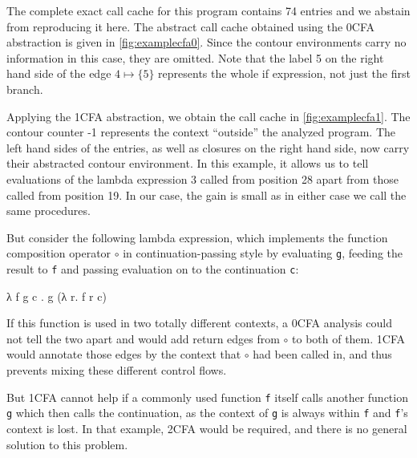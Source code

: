 \documentclass[a4paper,parskip=half,BCOR=8mm,DIV=calc,12pt]{scrbook}
\begin{document}
The complete exact call cache for this program contains 74 entries and we abstain from reproducing it here. The abstract call cache obtained using the 0CFA abstraction is given in \vref{fig:examplecfa0}. Since the contour environments carry no information in this case, they are omitted. Note that the label 5 on the right hand side of the edge $4 \mapsto \{5\}$ represents the whole if expression, not just the first branch.

Applying the 1CFA abstraction, we obtain the call cache in \vref{fig:examplecfa1}. The contour counter -1 represents the context “outside” the analyzed program.  The left hand sides of the entries, as well as closures on the right hand side, now carry their abstracted contour environment. In this example, it allows us to tell evaluations of the lambda expression 3 called from position 28 apart from those called from position 19. In our case, the gain is small as in either case we call the same procedures. %

But consider the following lambda expression, which implements the function composition operator $\circ$ in continuation-passing style by evaluating \verb-g-, feeding the result to \verb-f- and passing evaluation on to the continuation \verb-c-:
\begin{center}
\ttfamily λ f g c . g (λ r. f r c)
\end{center}
If this function is used in two totally different contexts, a 0CFA analysis could not tell the two apart and would add return edges from $\circ$ to both of them. 1CFA would annotate those edges by the context that $\circ$ had been called in, and thus prevents mixing these different control flows.

But 1CFA cannot help if a commonly used function \verb-f- itself calls another function \verb-g- which then calls the continuation, as the context of \verb-g- is always within \verb-f- and \verb-f-’s context is lost. In that example, 2CFA would be required, and there is no general solution to this problem.
\enlargethispage{1em}
\end{document}
